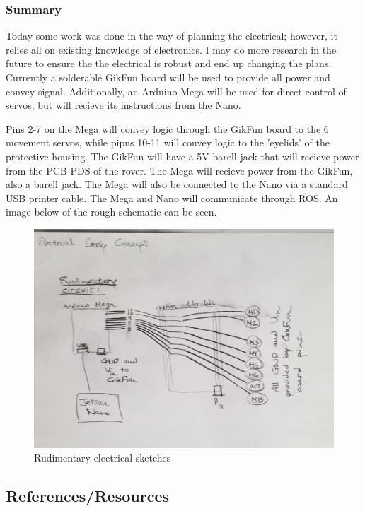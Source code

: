 \documentclass[a4paper, 10pt]{article}
\begin{document}
		\subsubsection{Summary}
		Today some work was done in the way of planning the electrical; however, it relies all on existing knowledge of electronics. I may do more research in the future to ensure the the electrical is robust and end up changing the plans. Currently a solderable GikFun board will be used to provide all power and convey signal. Additionally, an Arduino Mega will be used for direct control of servos, but will recieve its instructions from the Nano. 
		
		Pins 2-7 on the Mega will convey logic through the GikFun board to the 6 movement servos, while pipns 10-11 will convey logic to the 'eyelids' of the protective housing. The GikFun will have a 5V barell jack that will recieve power from the PCB PDS of the rover. The Mega will recieve power from the GikFun, also a barell jack. The Mega will also be connected to the Nano via a standard USB printer cable. The Mega and Nano will communicate through ROS. An image below of the rough schematic can be seen.
		
		\begin{figure} [h]
			\centering
			\includegraphics[scale=0.2]{early_electrical}
			\caption{Rudimentary electrical sketches}
			\label{fig_2}
		\end{figure}
		
	\subsection{References/Resources}
\end{document}
